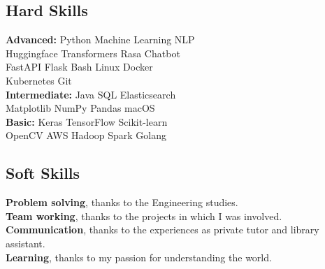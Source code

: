 \documentclass[]{deedy-resume-openfont}
\begin{document}
\begin{minipage}[t]{0.33\textwidth}
\subsection{Hard Skills}
\textbf{Advanced:} Python \textbullet{} Machine Learning \textbullet{} NLP \\
Huggingface Transformers \textbullet{} Rasa Chatbot \\
FastAPI \textbullet{} Flask \textbullet{} Bash \textbullet{} Linux \textbullet{} Docker \\
Kubernetes \textbullet{} Git \\
\textbf{Intermediate:} Java \textbullet{} SQL \textbullet{} Elasticsearch \\
Matplotlib \textbullet{} NumPy \textbullet{} Pandas \textbullet{} macOS \\
\textbf{Basic:} Keras \textbullet{} TensorFlow \textbullet{} Scikit-learn \\
OpenCV \textbullet{} AWS \textbullet{} Hadoop \textbullet{} Spark \textbullet{} Golang
\sectionsep

\subsection{Soft Skills}
\textbf{Problem solving}, thanks to the Engineering studies. \\
\textbf{Team working}, thanks to the projects in which I was involved. \\
\textbf{Communication}, thanks to the experiences as private tutor and library assistant. \\
\textbf{Learning}, thanks to my passion for understanding the world.





\end{minipage}
\end{document}

